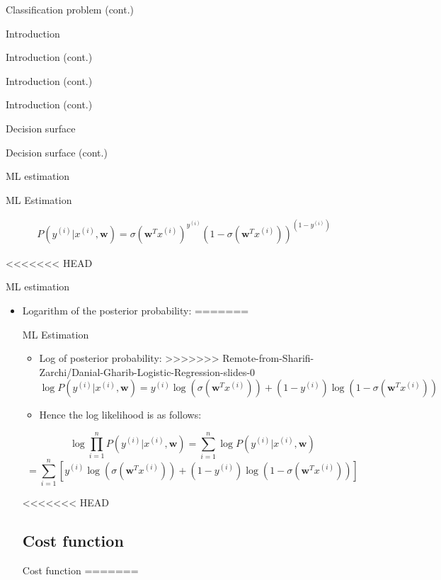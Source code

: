 \documentclass[serif, aspectratio=169]{beamer}
\begin{document}
\begin{frame}{Classification problem (cont.)}
\begin{itemize}
\begin{frame}{Introduction}
\begin{itemize}
\begin{frame}{Introduction (cont.)}
\begin{frame}{Introduction (cont.)}
\begin{frame}{Introduction (cont.)}
\begin{frame}{Decision surface}
\begin{itemize}
\begin{frame}{Decision surface (cont.)}
\begin{frame}{ML estimation}
\begin{frame}{ML Estimation}
\begin{itemize}
        \begin{align*}
            P(y^{(i)}|x^{(i)},\mathbf{w})=\sigma (\mathbf{w}^Tx^{(i)})^{y^{(i)}} (1 - \sigma (\mathbf{w}^T x^{(i)}))^{(1 - y^{(i)})}
        \end{align*}
    \end{itemize}
\end{frame}
<<<<<<< HEAD
\begin{frame}{ML estimation}
    \begin{itemize}
        \item Logarithm of the posterior probability:
=======
\begin{frame}{ML Estimation}
    \begin{itemize}
        \item Log of posterior probability:
>>>>>>> Remote-from-Sharifi-Zarchi/Danial-Gharib-Logistic-Regression-slides-0
            \[
            \log P(y^{(i)}|x^{(i)}, \mathbf{w})=
            y^{(i)}\log (\sigma (\mathbf{w} ^T x^{(i)})) + 
            (1-y^{(i)})\log (1 - \sigma (\mathbf{w}^T x^{(i)}))
            \]
        \item Hence the log likelihood is as follows:
    \end{itemize}
    \[
    \log \prod _{i=1}^{n} P(y^{(i)}|x^{(i)}, \mathbf{w}) = \sum  _{i=1}^{n} \log P(y^{(i)}|x^{(i)}, \mathbf{w})
    \]
    \[
    = \sum_{i=1}^{n}[y^{(i)}\log ( \sigma (\mathbf{w} ^T x^{(i)})) + 
    (1-y^{(i)})\log (1 - \sigma (\mathbf{w} ^ T x^{(i)}))]
    \]
\end{frame}


<<<<<<< HEAD
\subsection{Cost function}
\begin{frame}{Cost function}
=======

\end{frame}
\end{itemize}
\end{frame}
\end{frame}
\end{frame}
\end{itemize}
\end{frame}
\end{frame}
\end{frame}
\end{frame}
\end{itemize}
\end{frame}
\end{itemize}
\end{frame}
\end{document}
